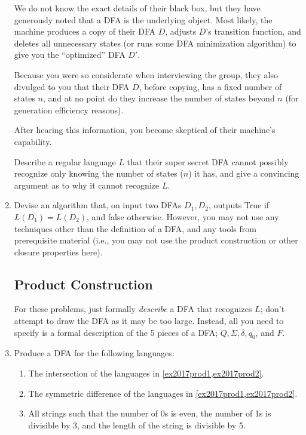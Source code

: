 \begin{enumerate}
We do not know the exact details of their black box, but they have generously noted that a DFA is the underlying object.
Most likely, the machine produces a copy of their DFA $D$, adjusts $D$'s transition function, and deletes all unnecessary states (or runs some DFA minimization algorithm) to give you the ``optimized'' DFA $D'$.

Because you were so considerate when interviewing the group, they also divulged to you that their DFA $D$, before copying, has a fixed number of states $n$, and at no point do they increase the number of states beyond $n$ (for generation efficiency reasons).

After hearing this information, you become skeptical of their machine's capability.

Describe a regular language $L$ that their super secret DFA cannot possibly recognize only knowing the number of states ($n$) it has, and give a convincing argument as to why it cannot recognize $L$.

\item \label{dfa_equal_no_product}  Devise an algorithm that, on input two DFAs $D_1, D_2$, outputs True if $L(D_1) = L(D_2)$, and false otherwise.
However, you may not use any techniques other than the definition of a DFA, and any tools from prerequisite material (i.e., you may not use the product construction or other closure properties here).

\subsection{Product Construction}

For these problems, just formally \emph{describe} a DFA that recognizes $L$; don't attempt to draw the DFA as it may be too large. 
Instead, all you need to specify is a formal description of the 5 pieces of a DFA; $Q, \Sigma, \delta, q_0$, and $F$.

\item Produce a DFA for the following languages:
\begin{enumerate}


\item {} The intersection of the languages in \cref{ex2017prod1,ex2017prod2}.

\item {} The symmetric difference of the languages in \cref{ex2017prod1,ex2017prod2}.

\item {} All strings such that the number of 0s is even, the number of 1s is divisible by 3, and the length of the string is divisible by 5.


\end{enumerate}
\end{enumerate}
